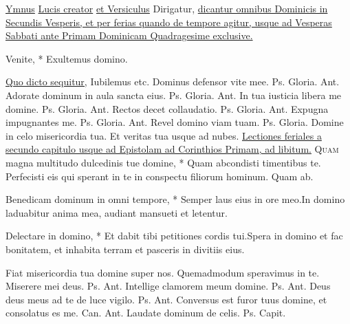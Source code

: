 \begin{multicols*}{2}
\newline \ul{Ymnus} \hyperlink{lucis-creator}{Lucis creator} \ul{et Versiculus} Dirigatur, \ul{dicantur omnibus Dominicis in Secundis Vesperis, et per ferias quando de tempore agitur, usque ad Vesperas Sabbati ante Primam Dominicam Quadragesime exclusive.}
{\color{Red} }
\par {}
\begin{invitatory}
{Venite, * Exultemus domino.}
\end{invitatory}
\newline \ul{Quo dicto sequitur,} Iubilemus etc.
 Dominus defensor vite mee. {\color{Red} Ps.}   Gloria. {\color{Red} Ant.} Adorate dominum in aula sancta eius. {\color{Red} Ps.}   Gloria. {\color{Red} Ant.} In tua iusticia libera me domine. {\color{Red} Ps.}   Gloria. {\color{Red} Ant.} Rectos decet collaudatio. {\color{Red} Ps.}   Gloria. {\color{Red} Ant.} Expugna impugnantes me. {\color{Red} Ps.}   Gloria. {\color{Red} Ant.} Revel domino viam tuam. {\color{Red} Ps.}   Gloria. \V Domine in celo misericordia tua. \R Et veritas tua usque ad nubes.
\newline \ul{Lectiones feriales a secundo capitulo usque ad Epistolam ad Corinthios Primam, ad libitum.} \R
\lettrine[lines=2]{\zallmancaps \color{Red} Q}{uam} \hypertarget{quam-magna}{\label{quam-magna}} magna multitudo dulcedinis tue domine, * Quam abcondisti timentibus te. \V Perfecisti eis qui sperant in te in conspectu filiorum hominum. Quam ab.
\begin{responsory}
{Benedicam dominum in omni tempore, * Semper laus eius in ore meo.}{In domino laduabitur anima mea, audiant mansueti et letentur.}
\end{responsory}
\begin{responsory-doxology}
{Delectare in domino, * Et dabit tibi petitiones cordis tui.}{Spera in domino et fac bonitatem, et inhabita terram et pasceris in divitiis eius.}
\end{responsory-doxology}
\newline \V Fiat misericordia tua domine super nos.
\newline \R Quemadmodum speravimus in te.
 Miserere mei deus. {\color{Red} Ps.}  {\color{Red} Ant.} Intellige clamorem meum domine. {\color{Red} Ps.}  {\color{Red} Ant.} Deus deus meus ad te de luce vigilo. {\color{Red} Ps.}  {\color{Red} Ant.} Conversus est furor tuus domine, et consolatus es me. {\color{Red} Can.}  {\color{Red} Ant.} Laudate dominum de celis. {\color{Red} Ps.}  {\color{Red} Capit.}

\end{multicols*}
